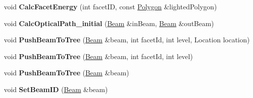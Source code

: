 \begin{DoxyCompactItemize}
void {\bfseries Calc\+Facet\+Energy} (int facet\+ID, const \mbox{\hyperlink{class_polygon}{Polygon}} \&lighted\+Polygon)
\item 
\mbox{\label{class_tracing_a05ee4083d55c4ed73f59ea5a9b90df61}} 
void {\bfseries Calc\+Optical\+Path\+\_\+initial} (\mbox{\hyperlink{class_beam}{Beam}} \&in\+Beam, \mbox{\hyperlink{class_beam}{Beam}} \&out\+Beam)
\item 
\mbox{\label{class_tracing_a2d3d2ac9923c515398381ef2a269e579}} 
void {\bfseries Push\+Beam\+To\+Tree} (\mbox{\hyperlink{class_beam}{Beam}} \&beam, int facet\+Id, int level, Location location)
\item 
\mbox{\label{class_tracing_a43f4c6c8b6641a5bfa009e6805d66e9d}} 
void {\bfseries Push\+Beam\+To\+Tree} (\mbox{\hyperlink{class_beam}{Beam}} \&beam, int facet\+Id, int level)
\item 
\mbox{\label{class_tracing_ae29bbd14ab8e082325839b55c68115a8}} 
void {\bfseries Push\+Beam\+To\+Tree} (\mbox{\hyperlink{class_beam}{Beam}} \&beam)
\item 
\mbox{\label{class_tracing_a1578036bb682b4d769c8baf4df6ad65d}} 
void {\bfseries Set\+Beam\+ID} (\mbox{\hyperlink{class_beam}{Beam}} \&beam)
\end{DoxyCompactItemize}

